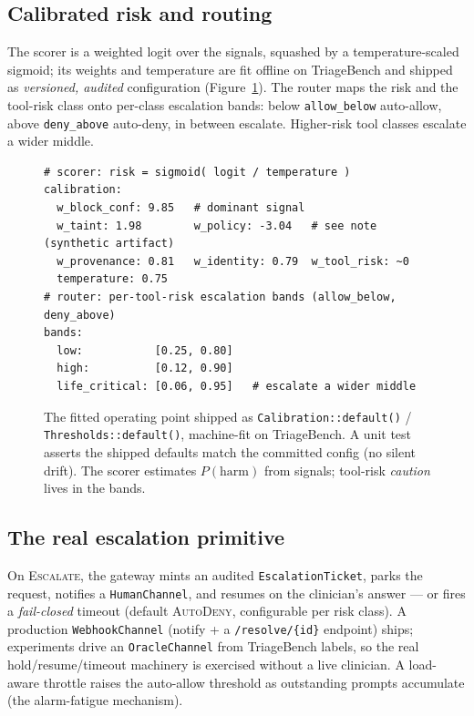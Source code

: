 \documentclass[11pt]{article}
\begin{document}
\subsection{Calibrated risk and routing}
The scorer is a weighted logit over the signals, squashed by a temperature-scaled
sigmoid; its weights and temperature are fit offline on TriageBench and shipped as
\emph{versioned, audited} configuration (Figure~\ref{fig:spec}). The router maps the
risk and the tool-risk class onto per-class escalation bands: below \texttt{allow\_below}
auto-allow, above \texttt{deny\_above} auto-deny, in between escalate. Higher-risk tool
classes escalate a wider middle.

\begin{figure}[htb]\centering
\begin{tcolorbox}[policycard, cardcol=cardblue, title=Fitted calibration (shipped config),
  width=0.86\linewidth]
\begin{lstlisting}[style=housespecyamlbare]
# scorer: risk = sigmoid( logit / temperature )
calibration:
  w_block_conf: 9.85   # dominant signal
  w_taint: 1.98        w_policy: -3.04   # see note (synthetic artifact)
  w_provenance: 0.81   w_identity: 0.79  w_tool_risk: ~0
  temperature: 0.75
# router: per-tool-risk escalation bands (allow_below, deny_above)
bands:
  low:           [0.25, 0.80]
  high:          [0.12, 0.90]
  life_critical: [0.06, 0.95]   # escalate a wider middle
\end{lstlisting}
\end{tcolorbox}
\caption{The fitted operating point shipped as \texttt{Calibration::default()} /
\texttt{Thresholds::default()}, machine-fit on TriageBench. A unit test asserts the
shipped defaults match the committed config (no silent drift). The scorer estimates
$P(\text{harm})$ from signals; tool-risk \emph{caution} lives in the bands.}
\label{fig:spec}
\end{figure}

\subsection{The real escalation primitive}
On \textsc{Escalate}, the gateway mints an audited \texttt{EscalationTicket}, parks the
request, notifies a \texttt{HumanChannel}, and resumes on the clinician's answer --- or
fires a \emph{fail-closed} timeout (default \textsc{AutoDeny}, configurable per risk
class). A production \texttt{WebhookChannel} (notify + a \texttt{/resolve/\{id\}}
endpoint) ships; experiments drive an \texttt{OracleChannel} from TriageBench labels, so
the real hold/resume/timeout machinery is exercised without a live clinician. A
load-aware throttle raises the auto-allow threshold as outstanding prompts accumulate
(the alarm-fatigue mechanism).
\end{document}
